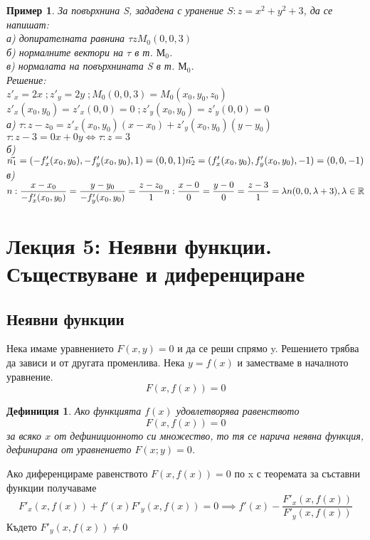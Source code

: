 \documentclass[fleqn,12pt]{article}
\newtheorem{example}{Пример}[subsection]
\newtheorem{definition}{Дефиниция}[subsection]
\begin{document}
\begin{example}
За повърхнина S, зададена с уранение $S: z= x^2 + y^2 + 3$, да се напишат: \\
а) допирателната равнина $\tau z  M_0 (0, 0, 3)$ \\
б) нормалните вектори на $\tau$ в т. $М_0$.\\
в) нормалата на повърхнината S в т. $М_0$. \\
Решение: \\
$z'_x = 2x\; ; z'_y = 2y\; ; M_0(0,0,3) = M_0(x_0, y_0, z_0) $\\
$z'_x(x_0, y_0) = z'_x(0,0) = 0\; ; z'_y(x_0, y_0) = z'_y(0,0) = 0$\\
а) $\tau : z - z_0 = z'_x (x_0, y_0)(x - x_0) + z'_y (x_0, y_0)(y - y_0) $\\
$\tau : z - 3 = 0x + 0y \Leftrightarrow \tau: z = 3$\\
б)$
\vec {n_1} = (-f'_x (x_0, y_0), -f'_y (x_0, y_0), 1) = (0, 0, 1) \\
\vec {n_2} = (f'_x (x_0, y_0), f'_y (x_0, y_0), -1) = (0, 0, -1) \\
$
в) $
n: \dfrac{x - x_0}{-f'_x (x_0, y_0)} = \dfrac{y-y_0}{-f'_y (x_0, y_0)} = \dfrac{z - z_0}{1} \\
n: \dfrac{x - 0}{0} = \dfrac{y-0}{0} = \dfrac{z - 3}{1} = \lambda \\
n (0, 0, \lambda + 3), \lambda \in \mathbb{R}
$
\\
\end{example}

\newpage

\section{Лекция 5: Неявни функции. Съществуване и диференциране }

\subsection{Неявни функции}
Нека имаме уравнението $F(x,y) = 0$ и да се реши спрямо y. Решението трябва да зависи и от другата променлива. Нека $y = f(x)$ и заместваме в началното уравнение. 
$$F(x,f(x)) = 0$$

\begin{definition}
Ако функцията $f(x)$ удовлетворява равенството 
$$F(x,f(x)) = 0$$
за всяко $x$ от дефиниционното си множество, то тя се нарича неявна функция, дефинирана от уравнението $F(x;y) = 0$.
\end{definition}
Ако диференцираме равенството $F(x,f(x)) = 0$ по x с теоремата за съставни функции получаваме 
$$F'_x(x,f(x)) + f'(x)F'_y(x,f(x)) = 0 \implies f'(x) - \dfrac{F'_x(x,f(x))}{F'_y(x,f(x))}$$
Където $F'_y(x,f(x)) \neq 0$
\end{document}
